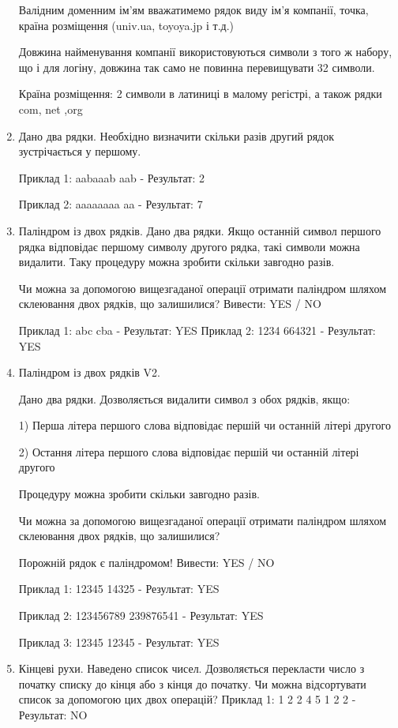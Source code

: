 \documentclass[]{article}
\begin{document}
\begin{enumerate}
Валідним доменним ім'ям вважатимемо рядок виду ім'я компанії, точка, країна розміщення (univ.ua, toyoya.jp і т.д.)

Довжина найменування компанії використовуються символи з того ж набору, що і для логіну, довжина так само не повинна перевищувати 32 символи.

Країна розміщення: 2 символи в латиниці в малому регістрі, а також рядки com, net ,org
 
\item
Дано два рядки. Необхідно визначити скільки разів другий рядок зустрічається у першому.

Приклад 1: aabaaab aab  - Результат: 2

Приклад 2: aaaaaaaa aa  - Результат: 7

\item

Паліндром із двох рядків.  Дано два рядки. Якщо останній символ першого рядка відповідає першому символу другого рядка, такі символи можна видалити. Таку процедуру можна зробити скільки завгодно разів.

Чи можна за допомогою вищезгаданої операції отримати паліндром шляхом склеювання двох рядків, що залишилися? Вивести: YES / NO

Приклад 1: abc cba  - Результат: YES 
Приклад 2: 1234 664321  - Результат: YES 

\item
Паліндром із двох рядків V2. 

Дано два рядки. Дозволяється видалити символ з обох рядків, якщо:

1) Перша літера першого слова відповідає першій чи останній літері другого

2) Остання літера першого слова відповідає першій чи останній літері другого

Процедуру можна зробити скільки завгодно разів.

Чи можна за допомогою вищезгаданої операції отримати паліндром шляхом склеювання двох рядків, що залишилися?

Порожній рядок є паліндромом! Вивести: YES / NO

Приклад 1: 12345 14325  - Результат: YES 

Приклад 2: 123456789 239876541  - Результат: YES 

Приклад 3: 12345 12345  - Результат: YES 

\item
Кінцеві рухи.   Наведено список чисел. Дозволяється перекласти число з початку списку до кінця або з кінця до початку.
Чи можна відсортувати список за допомогою цих двох операцій?
Приклад 1: 1 2 2 4 5 1 2 2  - Результат: NO


\end{enumerate}
\end{document}
